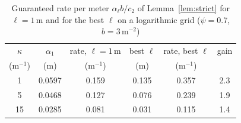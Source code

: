 \begin{table}[!t]
\caption{Guaranteed rate per meter $\alpha_\ell b/c_2$ of Lemma~\ref{lem:strict} for $\ell=1$\,m and for the best $\ell$ on a logarithmic grid ($\psi=0.7$, $b=3$\,m$^{-2}$)}\label{tab:scale}
\centering\footnotesize
\setlength{\tabcolsep}{3.5pt}
\begin{tabular}{@{}cccccc@{}}\toprule
$\kappa$ & $\alpha_1$ & rate, $\ell=1$\,m & best $\ell$ & rate, best $\ell$ & gain\\
(m$^{-1}$) & (m) & (m$^{-1}$) & (m) & (m$^{-1}$) & \\\midrule
1 & 0.0597 & 0.159 & 0.135 & 0.357 & 2.3\\
5 & 0.0468 & 0.127 & 0.076 & 0.239 & 1.9\\
15 & 0.0285 & 0.081 & 0.031 & 0.115 & 1.4\\\bottomrule
\end{tabular}
\end{table}
